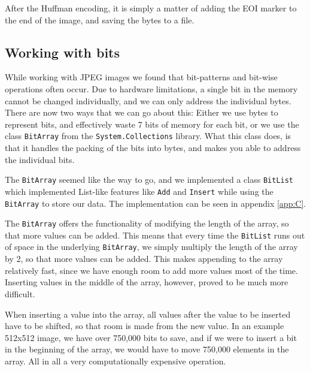 After the Huffman encoding, it is simply a matter of adding the EOI marker to the end of the image, and saving the bytes to a file. 

\subsection{Working with bits}
While working with JPEG images we found that bit-patterns and bit-wise operations often occur.
Due to hardware limitations, a single bit in the memory cannot be changed individually, and we can only address the individual bytes.
There are now two ways that we can go about this:
Either we use bytes to represent bits, and effectively waste 7 bits of memory for each bit, or we use the class \lstinline|BitArray| from the \lstinline|System.Collections| library.
What this class does, is that it handles the packing of the bits into bytes, and makes you able to address the individual bits.

The \lstinline|BitArray| seemed like the way to go, and we implemented a class \lstinline|BitList| which implemented List-like features like \lstinline|Add| and \lstinline|Insert| while using the \lstinline|BitArray| to store our data.
The implementation can be seen in appendix \ref{app:C}. 

The \lstinline|BitArray| offers the functionality of modifying the length of the array, so that more values can be added.
This means that every time the \lstinline|BitList| runs out of space in the underlying \lstinline|BitArray|, we simply multiply the length of the array by 2, so that more values can be added.
This makes appending to the array relatively fast, since we have enough room to add more values most of the time.
Inserting values in the middle of the array, however, proved to be much more difficult.

When inserting a value into the array, all values after the value to be inserted have to be shifted, so that room is made from the new value.
In an example 512x512 image, we have over 750,000 bits to save, and if we were to insert a bit in the beginning of the array, we would have to move 750,000 elements in the array.
All in all a very computationally expensive operation.

